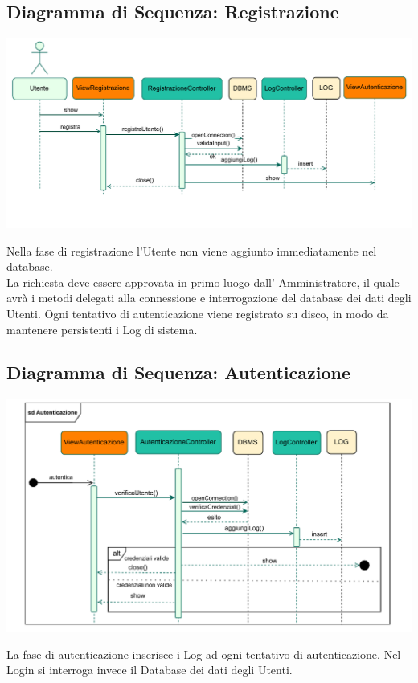 \subsection*{Diagramma di Sequenza: Registrazione}
{}
\vspace{0.5cm}
\begin{adjustwidth}{-2cm}{0cm}
\includegraphics[scale=0.9]{progettazione/Diagramma-Sequenza-Interazione-Registrazione.drawio.pdf}
\end{adjustwidth}
\vspace{0.5cm}
Nella fase di registrazione l'Utente non viene aggiunto immediatamente nel database.\\ La richiesta deve essere approvata in primo luogo dall' Amministratore, il quale avrà i metodi delegati alla connessione e interrogazione del database dei dati degli Utenti.
Ogni tentativo di autenticazione viene registrato su disco, in modo da mantenere persistenti i Log di sistema.

\subsection*{Diagramma di Sequenza: Autenticazione}
{}
\vspace{0.5cm}
\begin{adjustwidth}{-1cm}{0cm}
\includegraphics[scale=0.9]{progettazione/Diagramma-Sequenza-Interazione-Autenticazione.drawio.pdf}
\end{adjustwidth}
\vspace{0.5cm}
La fase di autenticazione inserisce i Log ad ogni tentativo di autenticazione. Nel Login si interroga invece il Database dei dati degli Utenti.

